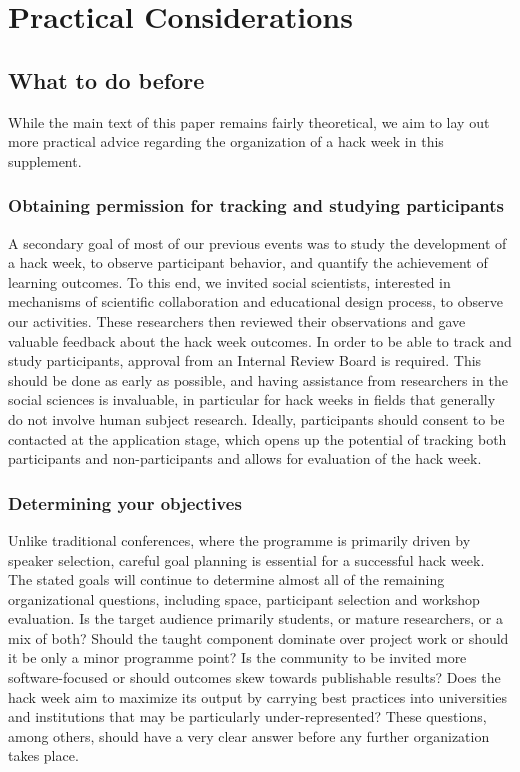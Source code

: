 \documentclass{aastex62}
\begin{document}
\clearpage

\section{Practical Considerations}
\subsection{What to do before}

\noindent While the main text of this paper remains fairly theoretical, we aim to lay out more practical advice regarding the organization of a hack week in this supplement.

\subsubsection{Obtaining permission for tracking and studying participants}
A secondary goal of most of our previous events was to study the development of a hack week, to observe participant behavior, and quantify the achievement of learning outcomes. To this end, we invited social scientists, interested in mechanisms of scientific collaboration and educational design process, to observe our activities. These researchers then reviewed their observations and gave valuable feedback about the hack week outcomes. In order to be able to track and study participants, approval from an Internal Review Board is required. This should be done as early as possible, and having assistance from researchers in the social sciences is invaluable, in particular for hack weeks in fields that generally do not involve human subject research. Ideally, participants should consent to be contacted at the application stage, which opens up the potential of tracking both participants and non-participants and allows for evaluation of the hack week.

\subsubsection{Determining your objectives}

Unlike traditional conferences, where the programme is primarily driven by speaker selection, careful goal planning is essential for a successful hack week. The stated goals will continue to determine almost all of the remaining organizational questions, including space, participant selection and workshop evaluation. Is the target audience primarily students, or mature researchers, or a mix of both? Should the taught component dominate over project work or should it be only a minor programme point? Is the community to be invited more software-focused or should outcomes skew towards publishable results? Does the hack week aim to maximize its output by carrying best practices into universities and institutions that may be particularly under-represented? These questions, among others, should have a very clear answer before any further organization takes place.
\end{document}
